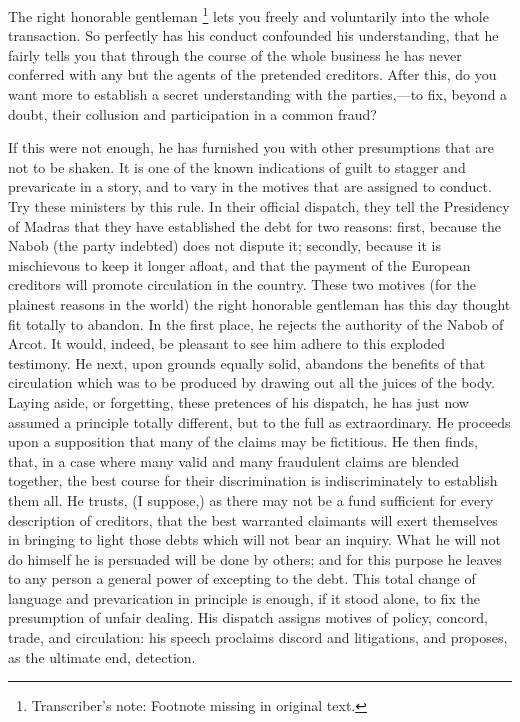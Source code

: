 The right honorable gentleman
\footnote{ Transcriber's note: Footnote missing in original text.}
 lets you freely and voluntarily into the whole transaction. So perfectly has his conduct confounded his understanding, that he fairly tells you that through the course of the whole business he has never conferred with any but the agents of the pretended creditors. After this, do you want more to establish a secret understanding with the parties,—to fix, beyond a doubt, their collusion and participation in a common fraud?

If this were not enough, he has furnished you with other presumptions that are not to be shaken. It is one of the known indications of guilt to stagger and prevaricate in a story, and to vary in the motives that are assigned to conduct. Try these ministers by this rule. In their official dispatch, they tell the Presidency of Madras that they have established the debt for two reasons: first, because the Nabob (the party indebted) does not dispute it; secondly, because it is mischievous to keep it longer afloat, and that the payment of the European creditors will promote circulation in the country. These two motives (for the plainest reasons in the world) the right honorable gentleman has this day thought fit totally to abandon. In the first place, he rejects the authority of the Nabob of Arcot. It would, indeed, be pleasant to see him adhere to this exploded testimony. He next, upon grounds equally solid, abandons the benefits of that circulation which was to be produced by drawing out all the juices of the body. Laying aside, or forgetting, these pretences of his dispatch, he has just now assumed a principle totally different, but to the full as extraordinary. He proceeds upon a supposition that many of the claims may be fictitious. He then finds, that, in a case where many valid and many fraudulent claims are blended together, the best course for their discrimination is indiscriminately to establish them all. He trusts, (I suppose,) as there may not be a fund sufficient for every description of creditors, that the best warranted claimants will exert themselves in bringing to light those debts which will not bear an inquiry. What he will not do himself he is persuaded will be done by others; and for this purpose he leaves to any person a general power of excepting to the debt. This total change of language and prevarication in principle is enough, if it stood alone, to fix the presumption of unfair dealing. His dispatch assigns motives of policy, concord, trade, and circulation: his speech proclaims discord and litigations, and proposes, as the ultimate end, detection.

